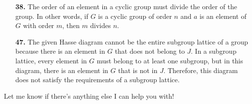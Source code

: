 \begin{enumerate}
\item[{\bf 38.}]
The order of an element in a cyclic group must divide the order of the group. In other words, if $G$ is a cyclic group of order $n$ and $a$ is an element of $G$ with order $m$, then $m$ divides $n$.

\item[{\bf 47.}]
The given Hasse diagram cannot be the entire subgroup lattice of a group because there is an element in $G$ that does not belong to $J$. In a subgroup lattice, every element in $G$ must belong to at least one subgroup, but in this diagram, there is an element in $G$ that is not in $J$. Therefore, this diagram does not satisfy the requirements of a subgroup lattice.

\end{enumerate}

Let me know if there's anything else I can help you with!